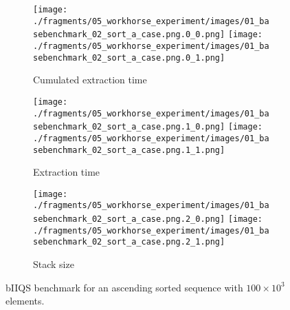 \begin{figure}

    \centering
    \begin{subfigure}[b]{\textwidth}
        \centering
        \texttt{[image: ./fragments/05\_workhorse\_experiment/images/01\_basebenchmark\_02\_sort\_a\_case.png.0\_0.png]}
        \texttt{[image: ./fragments/05\_workhorse\_experiment/images/01\_basebenchmark\_02\_sort\_a\_case.png.0\_1.png]}
        \caption{Cumulated extraction time}
        \label{FIG:WORKHORSE_BENCHMARK_02__0_0}
    \end{subfigure}

    \begin{subfigure}[b]{\textwidth}
        \centering
        \texttt{[image: ./fragments/05\_workhorse\_experiment/images/01\_basebenchmark\_02\_sort\_a\_case.png.1\_0.png]}
        \texttt{[image: ./fragments/05\_workhorse\_experiment/images/01\_basebenchmark\_02\_sort\_a\_case.png.1\_1.png]}
        \caption{Extraction time}
        \label{FIG:WORKHORSE_BENCHMARK_02__0_1}
    \end{subfigure}

    \begin{subfigure}[b]{\textwidth}
        \centering
        \texttt{[image: ./fragments/05\_workhorse\_experiment/images/01\_basebenchmark\_02\_sort\_a\_case.png.2\_0.png]}
        \texttt{[image: ./fragments/05\_workhorse\_experiment/images/01\_basebenchmark\_02\_sort\_a\_case.png.2\_1.png]}
        \caption{Stack size}
        \label{FIG:WORKHORSE_BENCHMARK_02__0_2}
    \end{subfigure}
    
    \caption{bIIQS benchmark for an ascending sorted sequence with $100\times10^3$ elements.}
       \label{FIG:WORKHORSE_BENCHMARK_02}
\end{figure}



